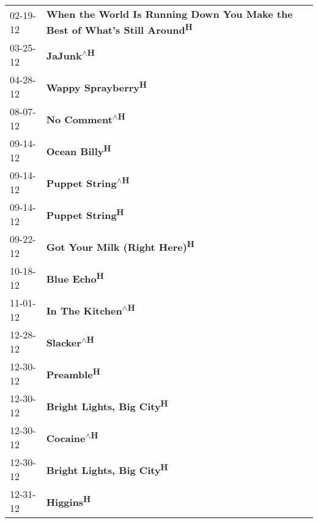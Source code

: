 \begin{supertabular}{p{0.25\columnwidth}p{0.75\columnwidth}}
 02-19-12 &  \textbf{When the World Is Running Down You Make the Best of What's Still Around\textsuperscript{H}} \\
 03-25-12 &                                                           \textbf{JaJunk\textsuperscript{$\wedge$H}} \\
 04-28-12 &                                                         \textbf{Wappy Sprayberry\textsuperscript{H}} \\
 08-07-12 &                                                       \textbf{No Comment\textsuperscript{$\wedge$H}} \\
 09-14-12 &                                                              \textbf{Ocean Billy\textsuperscript{H}} \\
 09-14-12 &                                                    \textbf{Puppet String\textsuperscript{$\wedge$H}} \\
 09-14-12 &                                                            \textbf{Puppet String\textsuperscript{H}} \\
 09-22-12 &                                               \textbf{Got Your Milk (Right Here)\textsuperscript{H}} \\
 10-18-12 &                                                                \textbf{Blue Echo\textsuperscript{H}} \\
 11-01-12 &                                                   \textbf{In The Kitchen\textsuperscript{$\wedge$H}} \\
 12-28-12 &                                                          \textbf{Slacker\textsuperscript{$\wedge$H}} \\
 12-30-12 &                                                                 \textbf{Preamble\textsuperscript{H}} \\
 12-30-12 &                                                  \textbf{Bright Lights, Big City\textsuperscript{H}} \\
 12-30-12 &                                                          \textbf{Cocaine\textsuperscript{$\wedge$H}} \\
 12-30-12 &                                                  \textbf{Bright Lights, Big City\textsuperscript{H}} \\
 12-31-12 &                                                                  \textbf{Higgins\textsuperscript{H}} \\
\end{supertabular}
